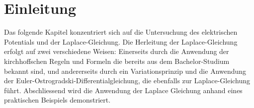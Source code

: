 %
%
%
%
\section{Einleitung\label{circuit:section:teil0}}
Das folgende Kapitel konzentriert sich auf die Untersuchung des elektrischen Potentials und der Laplace-Gleichung. Die Herleitung der Laplace-Gleichung erfolgt auf zwei verschiedene Weisen: Einerseits durch die Anwendung der kirchhoffschen Regeln und Formeln die bereits aus dem Bachelor-Studium bekannt sind, und andererseits durch ein Variationsprinzip und die Anwendung der Euler-Ostrogradski-Differentialgleichung, die ebenfalls zur Laplace-Gleichung führt. Abschliessend wird die Anwendung der Laplace Gleichung anhand eines praktischen Beispiels demonstriert.




